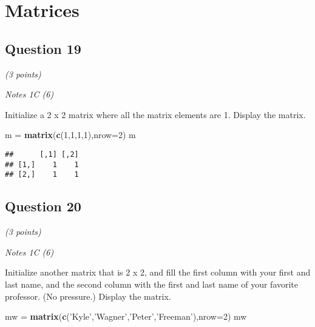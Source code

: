 \documentclass[
]{article}
\newenvironment{Shaded}{\begin{snugshade}}{\end{snugshade}}
\newcommand{\DataTypeTok}[1]{\textcolor[rgb]{0.13,0.29,0.53}{#1}}
\newcommand{\DecValTok}[1]{\textcolor[rgb]{0.00,0.00,0.81}{#1}}
\newcommand{\KeywordTok}[1]{\textcolor[rgb]{0.13,0.29,0.53}{\textbf{#1}}}
\newcommand{\NormalTok}[1]{#1}
\newcommand{\StringTok}[1]{\textcolor[rgb]{0.31,0.60,0.02}{#1}}
\begin{document}
\hypertarget{matrices}{%
\section{Matrices}\label{matrices}}

\hypertarget{question-19}{%
\subsection{Question 19}\label{question-19}}

\emph{(3 points)}

\emph{Notes 1C (6)}

Initialize a 2 x 2 matrix where all the matrix elements are 1. Display
the matrix.

\begin{Shaded}
\begin{Highlighting}[]
\NormalTok{m =}\StringTok{ }\KeywordTok{matrix}\NormalTok{(}\KeywordTok{c}\NormalTok{(}\DecValTok{1}\NormalTok{,}\DecValTok{1}\NormalTok{,}\DecValTok{1}\NormalTok{,}\DecValTok{1}\NormalTok{),}\DataTypeTok{nrow=}\DecValTok{2}\NormalTok{)}
\NormalTok{m}
\end{Highlighting}
\end{Shaded}

\begin{verbatim}
##      [,1] [,2]
## [1,]    1    1
## [2,]    1    1
\end{verbatim}

\hypertarget{question-20}{%
\subsection{Question 20}\label{question-20}}

\emph{(3 points)}

\emph{Notes 1C (6)}

Initialize another matrix that is 2 x 2, and fill the first column with
your first and last name, and the second column with the first and last
name of your favorite professor. (No pressure.) Display the matrix.

\begin{Shaded}
\begin{Highlighting}[]
\NormalTok{mw =}\StringTok{ }\KeywordTok{matrix}\NormalTok{(}\KeywordTok{c}\NormalTok{(}\StringTok{'Kyle'}\NormalTok{,}\StringTok{'Wagner'}\NormalTok{,}\StringTok{'Peter'}\NormalTok{,}\StringTok{'Freeman'}\NormalTok{),}\DataTypeTok{nrow=}\DecValTok{2}\NormalTok{)}
\NormalTok{mw}
\end{Highlighting}
\end{Shaded}
\end{document}
